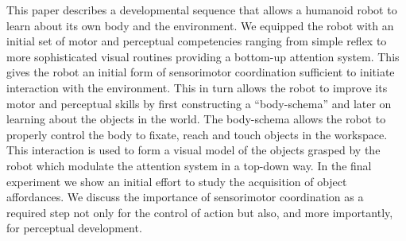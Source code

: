 This paper describes a developmental sequence that allows a humanoid robot to learn about its own body and the environment. We equipped the robot with an initial set of motor and perceptual competencies ranging from simple reflex to more sophisticated visual routines providing a bottom-up attention system. This gives the robot an initial form of sensorimotor coordination sufficient to initiate interaction with the environment. This in turn allows the robot to improve its motor and perceptual skills by first constructing a ``body-schema'' and later on learning about the objects in the world. The body-schema allows the robot to properly control the body to fixate, reach and touch objects in the workspace. This interaction is used to form a visual model of the objects grasped by the robot which modulate the attention system in a top-down way. In the final experiment we show an initial effort to study the acquisition of object affordances. We discuss the importance of sensorimotor coordination as a required step not only for the control of action but also, and more importantly, for perceptual development.

